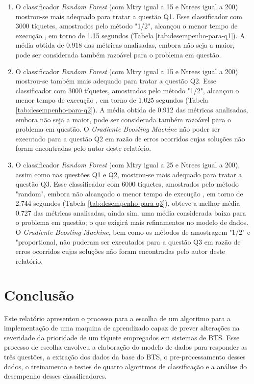 \documentclass[11pt,twoside]{article}
\begin{document}
\begin{enumerate}
  \item O classificador \textit{Random Forest} (com Mtry igual a 15 e Ntrees igual a 200) mostrou-se mais adequado para tratar a questão Q1. Esse classificador com 3000 tíquetes, amostrados pelo método "1/2", alcançou o menor tempo de execução , em torno de 1.15 segundos (Tabela \ref{tab:desempenho-para-q1}). A média obtida de {0.918} das métricas analisadas, embora não seja a maior, pode ser considerada também razoável para o problema em questão.
  \item O classificador \textit{Random Forest} (com Mtry igual a 15 e Ntrees igual a 200) mostrou-se também mais adequado para tratar a questão Q2. Esse classificador com 3000 tíquetes, amostrados pelo método "1/2", alcançou o menor tempo de execução , em torno de 1.025 segundos (Tabela \ref{tab:desempenho-para-q2}). A média obtida de {0.912} das métricas analisadas, embora não seja a maior, pode ser considerada também razoável para o problema em questão. O \textit{Gradiente Boosting Machine} não poder ser executado para a questão Q2 em razão de erros ocorridos cujas soluções não foram encontradas pelo autor deste relatório.
  \item O classificador \textit{Random Forest} (com Mtry igual a 25 e Ntrees igual a 200), assim como nas questões Q1 e Q2, mostrou-se mais adequado para tratar a questão Q3. Esse classificador com 6000 tíquetes, amostrados pelo método "random", embora não alcançado o menor tempo de execução , em torno de 2.744 segundos (Tabela \ref{tab:desempenho-para-q3}), obteve a melhor média {0.727} das métricas analisadas, ainda sim, uma média considerada baixa para o problema em questão; o que exigirá mais refinamentos no modelo de dados. O \textit{Gradiente Boosting Machine}, bem como os métodos de amostragem "1/2" e "proportional, não puderam ser executados para a questão Q3 em razão de erros ocorridos cujas soluções não foram encontradas pelo autor deste relatório.
\end{enumerate}

\section{Conclusão}
Este relatório apresentou o processo para a escolha de um algoritmo para a 
implementação de uma maquina de aprendizado capaz de prever alterações na 
severidade da prioridade de um tíquete empregados em sistemas de BTS. Esse processo de escolha
envolveu a elaboração do modelo de dados para responder as três questões, a extração dos dados
da base do BTS, o pre-processamento desses dados, o treinamento 
e testes de quatro algoritmos de classificação e a análise do desempenho 
desses classificadores. 
\end{document}
